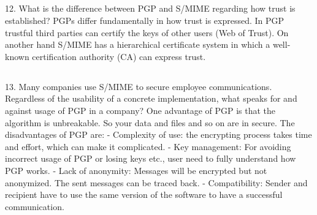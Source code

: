 \subsection{}
12. What is the difference between PGP and S/MIME regarding how trust is established? 
PGPs differ fundamentally in how trust is expressed. In PGP trustful third parties can certify the keys of other users (Web of Trust). On another hand S/MIME has a hierarchical certificate system in which a well-known certification authority (CA) can express trust. 

\subsection{}
13. Many companies use S/MIME to secure employee communications. Regardless of the usability of a concrete implementation, what speaks for and against usage of PGP in a company?
One advantage of PGP is that the algorithm is unbreakable. So your data and files and so on are in secure.
The disadvantages of PGP are:
-	Complexity of use: the encrypting process takes time and effort, which can make it complicated. 
-	Key management: For avoiding incorrect usage of PGP or losing keys etc., user need to fully understand how PGP works. 
-	Lack of anonymity: Messages will be encrypted but not anonymized. The sent messages can be traced back. 
-	Compatibility: Sender and recipient have to use the same version of the software to have a successful communication. 





